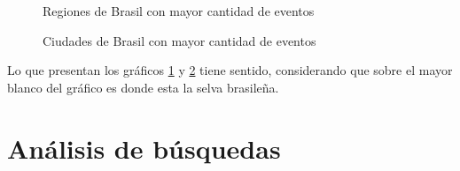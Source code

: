 \documentclass[a4paper]{article}
\begin{document}
\begin{figure}[h!]
	\caption{Regiones de Brasil con mayor cantidad de eventos}
	\label{fig:regionsbrasil}
\end{figure}

\begin{figure}[h!]
	\caption{Ciudades de Brasil con mayor cantidad de eventos}
	\label{fig:citybrasil}
\end{figure}

Lo que presentan los gráficos \ref{fig:regionsbrasil} y \ref{fig:citybrasil} tiene sentido, considerando que sobre el mayor blanco del gráfico es donde esta la selva brasileña.

\section{Análisis de búsquedas} \label{busq}
\end{document}
